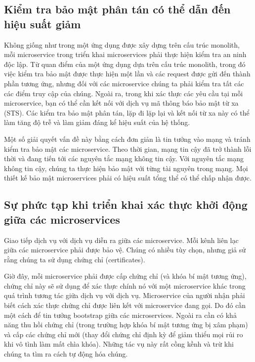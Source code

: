 \documentclass[12pt,a4paper]{report}
\begin{document}
		\subsection{Kiểm tra bảo mật phân tán có thể dẫn đến hiệu suất giảm}
				{\hspace{0.6cm}Không giống như trong một ứng dụng được xây dựng trên cấu trúc monolith, mỗi microservice trong triển khai microservices phải thực hiện kiểm tra an ninh độc lập. Từ quan điểm của một ứng dụng dựa trên cấu trúc monolith, trong đó việc kiểm tra bảo mật được thực hiện một lần và các request được gửi đến thành phần tương ứng, nhưng đối với các microservice chúng ta phải kiểm tra tất các các điểm truy cập của chúng. Ngoài ra, trong khi xác thực các yêu cầu tại mỗi microservice, bạn có thể cần kết nối với dịch vụ mã thông báo bảo mật từ xa (STS). Các kiểm tra bảo mật phân tán, lặp đi lặp lại và kết nối từ xa này có thể làm tăng độ trễ và làm giảm đáng kể hiệu suất của hệ thống.\\}
				
				Một số giải quyết vấn đề này bằng cách đơn giản là tin tưởng vào mạng và tránh kiểm tra bảo mật các microservice. Theo thời gian, mạng tin cậy đã trở thành lỗi thời và đang tiến tới các nguyên tắc mạng không tin cậy. Với nguyên tắc mạng không tin cậy, chúng ta thực hiện bảo mật với từng tài nguyên trong mạng. Mọi thiết kế bảo mật microservices phải có hiệu suất tổng thể có thể chấp nhận được.
		\subsection{Sự phức tạp khi triển khai xác thực khởi động giữa các	microservices}
				{\hspace{0.6cm}Giao tiếp dịch vụ với dịch vụ diễn ra giữa các microservice. Mỗi kênh liên lạc giữa các microservice phải được bảo vệ. Chúng có nhiều tùy chọn, nhưng giả sử rằng chúng ta sử dụng chứng chỉ (certificates).\\}
				
				Giờ đây, mỗi microservice phải được cấp chứng chỉ (và khóa bí mật tương ứng), chứng chỉ này sẽ sử dụng để xác thực chính nó với một microservice khác trong quá trình tương tác giữa dịch vụ với dịch vụ. Microservice của người nhận phải biết cách xác thực chứng chỉ được liên kết với microservice đang gọi. Do đó cần một cách để tin tưởng bootstrap giữa các microservices. Ngoài ra cần có khả năng thu hồi chứng chỉ (trong trường hợp khóa bí mật tương ứng bị xâm phạm) và cấp các chứng chỉ mới (thay đổi chứng chỉ định kỳ để giảm thiểu mọi rủi ro khi vô tình làm mất chìa khóa). Những tác vụ này rất cồng kềnh và trừ khi chúng ta tìm ra cách tự động hóa chúng.\\
\end{document}
